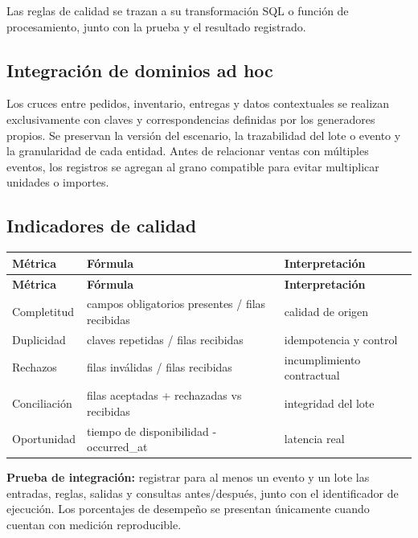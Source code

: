 \documentclass[11pt]{article}
\begin{document}
Las reglas de calidad se trazan a su transformación SQL o función de procesamiento, junto con la prueba y el resultado registrado.\par

\subsection{Integración de dominios ad hoc}

Los cruces entre pedidos, inventario, entregas y datos contextuales se realizan exclusivamente con claves y correspondencias definidas por los generadores propios. Se preservan la versión del escenario, la trazabilidad del lote o evento y la granularidad de cada entidad. Antes de relacionar ventas con múltiples eventos, los registros se agregan al grano compatible para evitar multiplicar unidades o importes.\par

\subsection{Indicadores de calidad}

\begingroup\small
\begin{longtable}{@{}>{\raggedright\arraybackslash}p{}>{\raggedright\arraybackslash}p{}>{\raggedright\arraybackslash}p{}@{}}
\toprule
\textbf{Métrica} & \textbf{Fórmula} & \textbf{Interpretación} \\
\midrule
\endfirsthead
\toprule
\textbf{Métrica} & \textbf{Fórmula} & \textbf{Interpretación} \\
\midrule
\endhead
Completitud & campos obligatorios presentes / filas recibidas & calidad de origen \\
Duplicidad & claves repetidas / filas recibidas & idempotencia y control \\
Rechazos & filas inválidas / filas recibidas & incumplimiento contractual \\
Conciliación & filas aceptadas + rechazadas vs recibidas & integridad del lote \\
Oportunidad & tiempo de disponibilidad - occurred\_\allowbreak{}at & latencia real \\
\bottomrule
\end{longtable}
\endgroup

\textbf{Prueba de integración:} registrar para al menos un evento y un lote las entradas, reglas, salidas y consultas antes/\allowbreak{}después, junto con el identificador de ejecución. Los porcentajes de desempeño se presentan únicamente cuando cuentan con medición reproducible.\par
\end{document}
